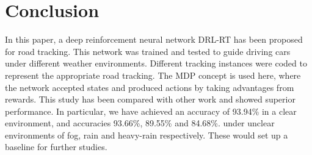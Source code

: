 \documentclass{svproc}
\begin{document}
\section{Conclusion}
In this paper, a deep reinforcement neural network DRL-RT has been proposed for road tracking. This network was trained and tested to guide driving cars under different weather environments. Different tracking instances were coded to represent the appropriate road tracking. The MDP concept is used here, where the network accepted states and produced actions by taking advantages from rewards. 
This study has been compared with other work and showed superior performance. %
In particular, we have achieved %
an accuracy of 93.94\% in a clear environment, and  accuracies  93.66\%, 89.55\% and 84.68\%. %
under unclear environments of fog, rain and heavy-rain respectively. These would set up a baseline for further studies. 
%
%
%
%

 
\end{document}
